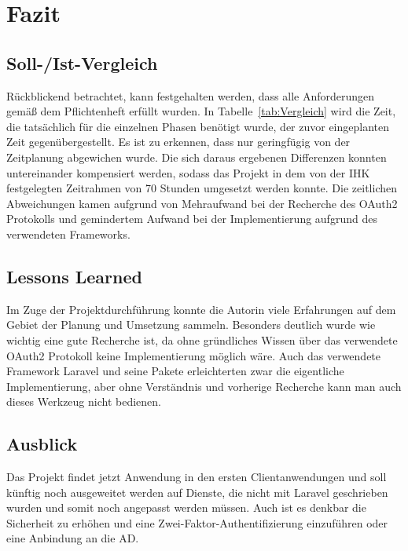 \section{Fazit} 
\label{sec:Fazit}

\subsection{Soll-/Ist-Vergleich}
\label{sec:SollIstVergleich}

Rückblickend betrachtet, kann festgehalten werden, dass alle Anforderungen gemäß dem Pflichtenheft erfüllt wurden. 
In Tabelle~\ref{tab:Vergleich} wird die Zeit, die tatsächlich für die einzelnen Phasen benötigt wurde, der zuvor eingeplanten Zeit gegenübergestellt. 
Es ist zu erkennen, dass nur geringfügig von der Zeitplanung abgewichen wurde. Die sich daraus ergebenen Differenzen konnten untereinander kompensiert werden, sodass das Projekt in dem von der IHK festgelegten Zeitrahmen von 70 Stunden umgesetzt werden konnte.
Die zeitlichen Abweichungen kamen aufgrund von Mehraufwand bei der Recherche des OAuth2 Protokolls und gemindertem Aufwand bei der Implementierung aufgrund des verwendeten Frameworks.


\subsection{Lessons Learned}
\label{sec:LessonsLearned}

Im Zuge der Projektdurchführung konnte die Autorin viele Erfahrungen auf dem Gebiet der Planung und Umsetzung sammeln.
Besonders deutlich wurde wie wichtig eine gute Recherche ist, da ohne gründliches Wissen über das verwendete OAuth2 Protokoll keine Implementierung möglich wäre.
Auch das verwendete Framework Laravel und seine Pakete erleichterten zwar die eigentliche Implementierung, aber ohne Verständnis und vorherige Recherche kann man auch dieses Werkzeug nicht bedienen. 

\subsection{Ausblick}
\label{sec:Ausblick}

Das Projekt findet jetzt Anwendung in den ersten Clientanwendungen und soll künftig noch ausgeweitet werden auf Dienste, die nicht mit Laravel geschrieben wurden und somit noch angepasst werden müssen. Auch ist es denkbar die Sicherheit zu erhöhen und eine Zwei-Faktor-Authentifizierung einzuführen oder eine Anbindung an die AD.
